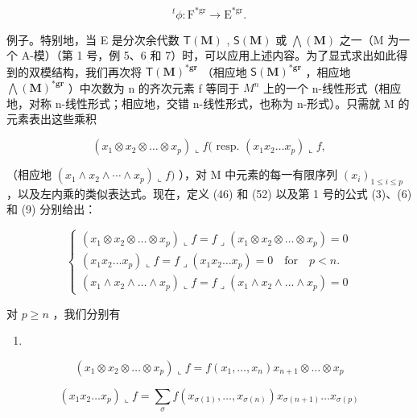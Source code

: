 \[
{ } ^ { t } \phi : \mathrm{F} ^ { * \mathrm{gr} } \rightarrow \mathrm{E} ^ { * \mathrm{gr} } .
\]

例子。特别地，当 E 是分次余代数 \(\mathsf{T}(\mathbf{M})\) , \(\mathsf{S}(\mathbf{M})\) 或 \(\bigwedge(\mathbf{M})\) 之一（M 为一个 A-模）（第 1 号，例 5、6 和 7）时，可以应用上述内容。为了显式求出如此得到的双模结构，我们再次将 \(\mathsf{T}(\mathbf{M})^{*\mathbf{g}\mathbf{r}}\) （相应地 \(\mathsf{S}(\mathbf{M})^{*\mathbf{g}\mathbf{r}}\) ，相应地 \(\bigwedge(\mathbf{M})^{*\mathbf{g}\mathbf{r}}\) ）中次数为 n 的齐次元素 f 等同于 \(M^{n}\) 上的一个 n-线性形式（相应地，对称 n-线性形式；相应地，交错 n-线性形式，也称为 n-形式）。只需就 M 的元素表出这些乘积

\[
\left(x _ {1} \otimes x _ {2} \otimes \dots \otimes x _ {p}\right) \llcorner f (\text { resp. } (x _ {1} x _ {2} \dots x _ {p}) \llcorner f,
\]

（相应地 \((x_{1} \wedge x_{2} \wedge \cdots \wedge x_{p}) \llcorner f)\) ），对 M 中元素的每一有限序列 \((x_{i})_{1 \leqslant i \leqslant p}\) ，以及左内乘的类似表达式。现在，定义 (46) 和 (52) 以及第 1 号的公式 (3)、(6) 和 (9) 分别给出：

\[
\left\{ \begin{array}{l} (x _ {1} \otimes x _ {2} \otimes \dots \otimes x _ {p}) \llcorner f = f \lrcorner (x _ {1} \otimes x _ {2} \otimes \dots \otimes x _ {p}) = 0 \\ (x _ {1} x _ {2} \ldots x _ {p}) \llcorner f = f \lrcorner (x _ {1} x _ {2} \ldots x _ {p}) = 0 \quad \text {for} \quad p <   n. \\ (x _ {1} \wedge x _ {2} \wedge \dots \wedge x _ {p}) \llcorner f = f \lrcorner (x _ {1} \wedge x _ {2} \wedge \dots \wedge x _ {p}) = 0 \end{array} \right.\tag{57}
\]

对 \(p \geqslant n\) ，我们分别有

\begin{enumerate}
\def\labelenumi{(\arabic{enumi})}
\setcounter{enumi}{57}
\tightlist
\item
\end{enumerate}

\[
\left(x _ {1} \otimes x _ {2} \otimes \dots \otimes x _ {p}\right) \llcorner f = f \left(x _ {1}, \dots , x _ {n}\right) x _ {n + 1} \otimes \dots \otimes x _ {p}\tag{59}
\]

\[
\left(x _ {1} x _ {2} \dots x _ {p}\right) \llcorner f = \sum_ {\sigma} f \left(x _ {\sigma (1)}, \dots , x _ {\sigma (n)}\right) x _ {\sigma (n + 1)} \dots x _ {\sigma (p)}\tag{60}
\]

